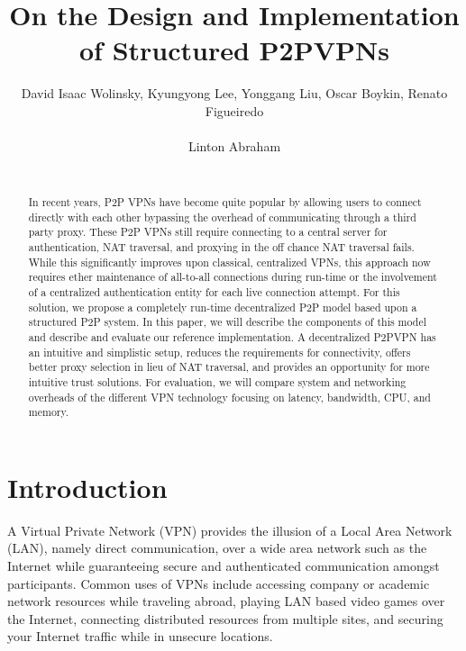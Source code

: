 \documentclass{sig-alternate}
\begin{document}
\title{On the Design and Implementation of Structured P2PVPNs}

\author{
\alignauthor
{David Isaac Wolinsky, Kyungyong Lee, Yonggang Liu, Oscar Boykin,
Renato Figueiredo}\\
       \\
\alignauthor
{Linton Abraham}\\
  \\
}

\maketitle
\begin{abstract}
\begin{sloppypar}
In recent years, P2P VPNs have become quite popular by allowing users to connect
directly with each other bypassing the overhead of communicating through a third
party proxy. These P2P VPNs still require connecting to a central server for
authentication, NAT traversal, and proxying in the off chance NAT traversal
fails. While this significantly improves upon classical, centralized VPNs, this
approach now requires ether maintenance of all-to-all connections during
run-time or the involvement of a centralized authentication entity for each live
connection attempt.  For this solution, we propose a completely run-time
decentralized P2P model based upon a structured P2P system.  In this paper, we
will describe the components of this model and describe and evaluate our
reference implementation. A decentralized P2PVPN has an intuitive and simplistic
setup, reduces the requirements for connectivity, offers better proxy selection
in lieu of NAT traversal, and provides an opportunity for more intuitive trust
solutions. For evaluation, we will compare system and networking overheads of
the different VPN technology focusing on latency, bandwidth, CPU, and memory.
\end{sloppypar}
\end{abstract}

\section{Introduction}
A Virtual Private Network (VPN) provides the illusion of a Local Area Network
(LAN), namely direct communication, over a wide area network such as the
Internet while guaranteeing secure and authenticated communication amongst
participants.  Common uses of VPNs include accessing company or academic
network resources while traveling abroad, playing LAN based video games over the
Internet, connecting distributed resources from multiple sites, and securing
your Internet traffic while in unsecure locations.
\end{document}
